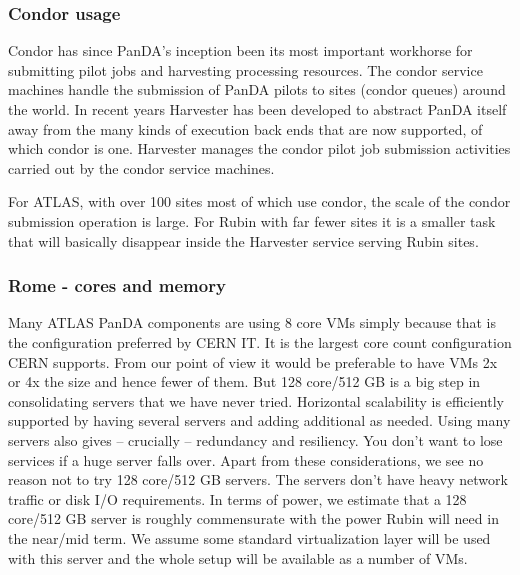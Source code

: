 \subsubsection {Condor usage }
Condor has since PanDA’s inception been its most important workhorse for submitting pilot jobs and harvesting processing resources. The condor service machines handle the submission of PanDA pilots to sites (condor queues) around the world. In recent years Harvester has been developed to abstract PanDA itself away from the many kinds of execution back ends that are now supported, of which condor is one. Harvester manages the condor pilot job submission activities carried out by the condor service machines.

For ATLAS, with over 100 sites most of which use condor, the scale of the condor submission operation is large. For Rubin with far fewer sites it is a smaller task that will basically disappear inside the Harvester service serving Rubin sites.

\subsubsection{Rome  - cores and memory }
Many ATLAS PanDA components are using 8 core VMs simply because that is the configuration preferred by CERN IT. It is the largest core count configuration CERN supports. From our point of view it would be preferable to have VMs 2x or 4x the size and hence fewer of them. But 128 core/512 GB is a big step in consolidating servers that we have never tried. Horizontal scalability is efficiently supported by having several servers and adding additional as needed. Using many servers also gives -- crucially -- redundancy and resiliency. You don’t want to lose services if a huge server falls over.  Apart from these considerations, we see no reason not to try 128 core/512 GB servers. The servers don't have heavy network traffic or disk I/O requirements. In terms of power, we estimate that a 128 core/512 GB server is roughly commensurate with the power Rubin will need in the near/mid term. We assume some standard virtualization layer will be used with this server and the whole setup will be available as a number of VMs.



